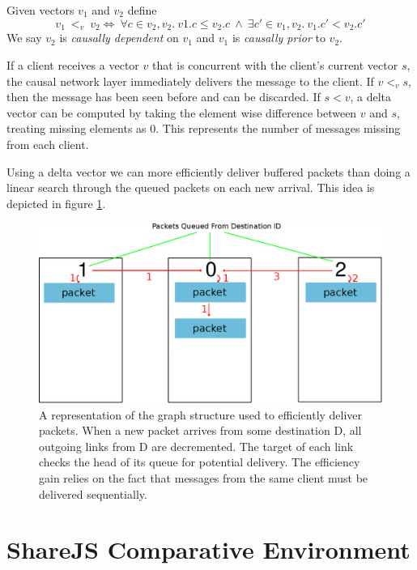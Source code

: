 \documentclass[12pt,a4paper,twoside,openright]{report}
\begin{document}
		Given vectors $v_1$ and $v_2$ define \[v_1\ <_v\ v_2 \iff\ \forall c \in v_2, v_2.\ v1.c \leq v_2.c\ \land\ \exists c' \in v_1, v_2.\ v_1.c' < v_2.c'\]
		We say $v_2$ is \textit{causally dependent} on $v_1$ and $v_1$ is \textit{causally prior} to $v_2$.
		
		If a client receives a vector $v$ that is concurrent with the client's current vector $s$, the causal network layer immediately delivers the message to the client. If $v <_v s$, then the message has been seen before and can be discarded. If $s < v$, a delta vector can be computed by taking the element wise difference between $v$ and $s$, treating missing elements as $0$. This represents the number of messages missing from each client. 
		
		Using a delta vector we can more efficiently deliver buffered packets than doing a linear search through the queued packets on each new arrival. This idea is depicted in figure \ref{fig:efficient}.
 		\begin{figure}[htb]
 		\centering
 		\includegraphics[width=1\linewidth]{figs/efficient_message_buffer.eps}
 		\caption[Dependency Graph in Message Buffer]{A representation of the graph structure used to efficiently deliver packets. When a new packet arrives from some destination D, all outgoing links from D are decremented. The target of each link checks the head of its queue for potential delivery. The efficiency gain relies on the fact that messages from the same client must be delivered sequentially.}
 		\label{fig:efficient}
 		\end{figure}
		
	
	
\section{ShareJS Comparative Environment} \label{sec:comparative}
\end{document}
